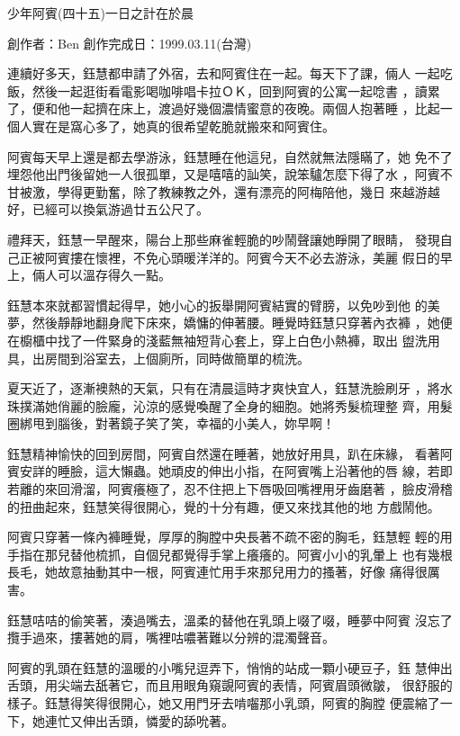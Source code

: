 



少年阿賓(四十五)一日之計在於晨

創作者：Ben
創作完成日：1999.03.11(台灣)


連續好多天，鈺慧都申請了外宿，去和阿賓住在一起。每天下了課，倆人
一起吃飯，然後一起逛街看電影喝咖啡唱卡拉ＯＫ，回到阿賓的公寓一起唸書
，讀累了，便和他一起擠在床上，渡過好幾個濃情蜜意的夜晚。兩個人抱著睡
，比起一個人實在是窩心多了，她真的很希望乾脆就搬來和阿賓住。

阿賓每天早上還是都去學游泳，鈺慧睡在他這兒，自然就無法隱瞞了，她
免不了埋怨他出門後留她一人很孤單，又是嘻嘻的訕笑，說笨驢怎麼下得了水
，阿賓不甘被激，學得更勤奮，除了教練教之外，還有漂亮的阿梅陪他，幾日
來越游越好，已經可以換氣游過廿五公尺了。

禮拜天，鈺慧一早醒來，陽台上那些麻雀輕脆的吵鬧聲讓她睜開了眼睛，
發現自己正被阿賓摟在懷裡，不免心頭暖洋洋的。阿賓今天不必去游泳，美麗
假日的早上，倆人可以溫存得久一點。

鈺慧本來就都習慣起得早，她小心的扳舉開阿賓結實的臂膀，以免吵到他
的美夢，然後靜靜地翻身爬下床來，嬌慵的伸著腰。睡覺時鈺慧只穿著內衣褲
，她便在櫥櫃中找了一件緊身的淺藍無袖短背心套上，穿上白色小熱褲，取出
盥洗用具，出房間到浴室去，上個廁所，同時做簡單的梳洗。

夏天近了，逐漸襖熱的天氣，只有在清晨這時才爽快宜人，鈺慧洗臉刷牙
，將水珠撲滿她俏麗的臉龐，沁涼的感覺喚醒了全身的細胞。她將秀髮梳理整
齊，用髮圈綁甩到腦後，對著鏡子笑了笑，幸福的小美人，妳早啊！

鈺慧精神愉快的回到房間，阿賓自然還在睡著，她放好用具，趴在床緣，
看著阿賓安詳的睡臉，這大懶蟲。她頑皮的伸出小指，在阿賓嘴上沿著他的唇
線，若即若離的來回滑溜，阿賓癢極了，忍不住把上下唇吸回嘴裡用牙齒磨著
，臉皮滑稽的扭曲起來，鈺慧笑得很開心，覺的十分有趣，便又來找其他的地
方戲鬧他。

阿賓只穿著一條內褲睡覺，厚厚的胸膛中央長著不疏不密的胸毛，鈺慧輕
輕的用手指在那兒替他梳抓，自個兒都覺得手掌上癢癢的。阿賓小小的乳暈上
也有幾根長毛，她故意抽動其中一根，阿賓連忙用手來那兒用力的搔著，好像
痛得很厲害。

鈺慧咭咭的偷笑著，湊過嘴去，溫柔的替他在乳頭上啜了啜，睡夢中阿賓
沒忘了攬手過來，摟著她的肩，嘴裡咕噥著難以分辨的混濁聲音。

阿賓的乳頭在鈺慧的溫暖的小嘴兒逗弄下，悄悄的站成一顆小硬豆子，鈺
慧伸出舌頭，用尖端去舐著它，而且用眼角窺覬阿賓的表情，阿賓眉頭微皺，
很舒服的樣子。鈺慧得笑得很開心，她又用門牙去啃囓那小乳頭，阿賓的胸膛
便震縮了一下，她連忙又伸出舌頭，憐愛的舔吮著。

